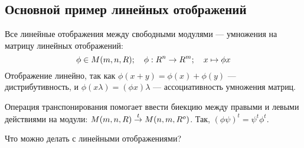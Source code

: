 \documentclass[a4paper]{report}
\begin{document}
    \subsection{Основной пример линейных отображений}
    Все линейные отображения между свободными модулями --- умножения на матрицу линейных отображений:
    \[\phi \in M(m, n, R); \quad \phi: R^n \rightarrow R^m; \quad x \mapsto \phi x\]
    Отображение линейно, так как $\phi(x + y) = \phi(x) + \phi(y)$ --- дистрибутивность, и $\phi(x \lambda) = (\phi x)\lambda$ --- ассоциативность умножения матриц.

    Операция транспонирования помогает ввести биекцию между правыми и левыми действиями на модули: $M(m, n, R) \overset{t}{\rightarrow} M(n, m, R^o)$.
    Так, $(\phi \psi)^t = \psi^t \phi^t$.

    Что можно делать с линейными отображениями?
\end{document}

